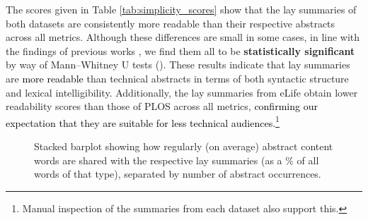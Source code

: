 \documentclass[11pt]{article}
\begin{document}
The scores given in Table \ref{tab:simplicity_scores} show that the lay summaries of both datasets are consistently more readable than their respective abstracts across all metrics. Although these differences are small in some cases, in line with the findings of previous works \citep{Devaraj2021-ha}, we find them all to be \textbf{statistically significant} by way of Mann–Whitney U tests (). 
These results indicate that lay summaries are \textcolor{black}{more readable} than technical abstracts in terms of both syntactic structure and lexical intelligibility.
Additionally, the lay summaries from eLife obtain lower readability scores than those of PLOS across all metrics, \textcolor{black}{confirming our expectation that they are suitable for less technical audiences.}\footnote{Manual inspection of the summaries from each dataset also support this.} 


\begin{table}[t]
    \centering
    \caption{Mean percentage of each rhetorical label within our abstracts and lay summaries.}
    \label{tab:discourse_percs}
\end{table}



\begin{figure*}[ht]
    \centering
    \caption{Stacked barplot showing how regularly (on average) abstract content words are shared with the respective lay summaries (as a \% of all words of that type), separated by number of abstract occurrences.}
    \label{fig:content_word_sharing}
\end{figure*}
\end{document}
